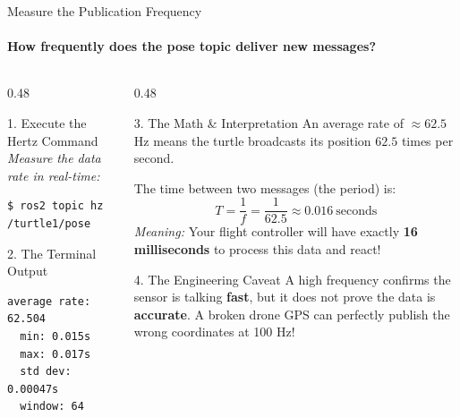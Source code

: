 \begin{frame}[fragile]{Measure the Publication Frequency}
\framesubtitle{How frequently does the pose topic deliver new messages?}

\footnotesize

\begin{columns}[T,onlytextwidth]

    \begin{column}{0.48\textwidth}
        \begin{block}{1. Execute the Hertz Command}
            \textit{Measure the data rate in real-time:}
\begin{verbatim}
$ ros2 topic hz /turtle1/pose
\end{verbatim}
        \end{block}

        \begin{exampleblock}{2. The Terminal Output}
\begin{verbatim}
average rate: 62.504
  min: 0.015s
  max: 0.017s
  std dev: 0.00047s
  window: 64
\end{verbatim}
        \end{exampleblock}
    \end{column}

    \begin{column}{0.48\textwidth}
        \begin{block}{3. The Math \& Interpretation}
            An average rate of $\approx 62.5$ Hz means the turtle broadcasts its position $62.5$ times per second. 
            
            \vspace{0.1cm}
            The time between two messages (the period) is:
            \[
            T = \frac{1}{f}
              = \frac{1}{62.5}
              \approx 0.016~\text{seconds}
            \]
            \textit{Meaning:} Your flight controller will have exactly \textbf{16 milliseconds} to process this data and react!
        \end{block}

        \vspace{0.1cm}

        \begin{alertblock}{4. The Engineering Caveat}
            A high frequency confirms the sensor is talking \textbf{fast}, but it does not prove the data is \textbf{accurate}. A broken drone GPS can perfectly publish the wrong coordinates at 100 Hz!
        \end{alertblock}
    \end{column}

\end{columns}

\end{frame}

